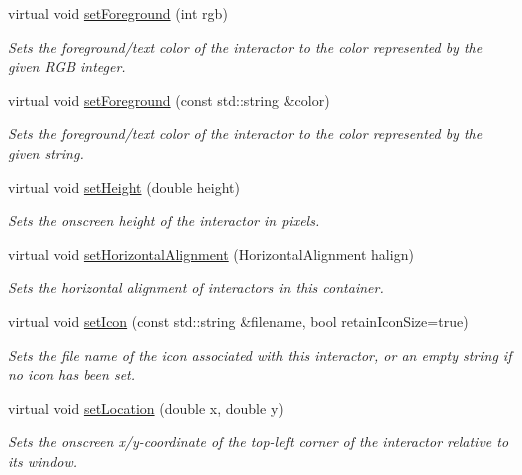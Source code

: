 \begin{DoxyCompactItemize}
virtual void \mbox{\hyperlink{classGInteractor_a9eb856b5ff83a19df3831a31f15f4563}{set\+Foreground}} (int rgb)
\begin{DoxyCompactList}\small\item\em Sets the foreground/text color of the interactor to the color represented by the given R\+GB integer. \end{DoxyCompactList}\item 
virtual void \mbox{\hyperlink{classGInteractor_af59209aeadea6dfc6d97a2d8531f50e1}{set\+Foreground}} (const std\+::string \&color)
\begin{DoxyCompactList}\small\item\em Sets the foreground/text color of the interactor to the color represented by the given string. \end{DoxyCompactList}\item 
virtual void \mbox{\hyperlink{classGInteractor_a9e280bfc4544dfaf8e4376c4e1a74357}{set\+Height}} (double height)
\begin{DoxyCompactList}\small\item\em Sets the onscreen height of the interactor in pixels. \end{DoxyCompactList}\item 
virtual void \mbox{\hyperlink{classGContainer_a901653aacb9991ee9a8b70d4a932f0c9}{set\+Horizontal\+Alignment}} (Horizontal\+Alignment halign)
\begin{DoxyCompactList}\small\item\em Sets the horizontal alignment of interactors in this container. \end{DoxyCompactList}\item 
virtual void \mbox{\hyperlink{classGInteractor_a762e139aa311461c3984d3ad28293f64}{set\+Icon}} (const std\+::string \&filename, bool retain\+Icon\+Size=true)
\begin{DoxyCompactList}\small\item\em Sets the file name of the icon associated with this interactor, or an empty string if no icon has been set. \end{DoxyCompactList}\item 
virtual void \mbox{\hyperlink{classGInteractor_a04594e8ba9b98513a64f1da00dcae18c}{set\+Location}} (double x, double y)
\begin{DoxyCompactList}\small\item\em Sets the onscreen x/y-\/coordinate of the top-\/left corner of the interactor relative to its window. \end{DoxyCompactList}\item 

\end{DoxyCompactItemize}
